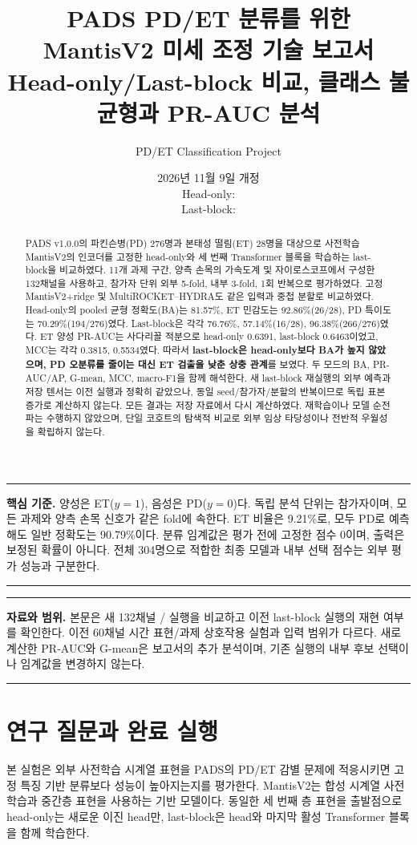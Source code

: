 \documentclass[11pt,a4paper]{article}
\title{\color{navy}\bfseries PADS PD/ET 분류를 위한\\[.3em]
 MantisV2 미세 조정 기술 보고서\\[.6em]
 \large Head-only/Last-block 비교, 클래스 불균형과 PR-AUC 분석}
\author{PD/ET Classification Project}
\date{2026년 11월 9일 개정\\[.25em]\small Head-only: \code{20261109T032315873662Z}\\
 Last-block: \code{20261109T041659480074Z}}
\newcommand{\code}[1]{\texttt{\detokenize{#1}}}
\newenvironment{keybox}{\begin{center}\begin{minipage}{.94\linewidth}\color{navy}\hrule\vspace{.6em}\small}
 {\vspace{.5em}\hrule\end{minipage}\end{center}}
\begin{document}
\maketitle\thispagestyle{empty}
\begin{abstract}
PADS v1.0.0의 파킨슨병(PD) 276명과 본태성 떨림(ET) 28명을 대상으로
사전학습 MantisV2의 인코더를 고정한 head-only와 세 번째 Transformer 블록을
학습하는 last-block을 비교하였다.
11개 과제 구간, 양측 손목의 가속도계 및 자이로스코프에서 구성한 132채널을 사용하고,
참가자 단위 외부 5-fold, 내부 3-fold, 1회 반복으로 평가하였다.
고정 MantisV2+ridge 및 MultiROCKET--HYDRA도 같은 입력과 중첩 분할로 비교하였다.
Head-only의 pooled 균형 정확도(BA)는 81.57\%, ET 민감도는 92.86\%(26/28),
PD 특이도는 70.29\%(194/276)였다. Last-block은 각각
76.76\%, 57.14\%(16/28), 96.38\%(266/276)였다.
ET 양성 PR-AUC는 사다리꼴 적분으로 head-only 0.6391, last-block 0.6463이었고,
MCC는 각각 0.3815, 0.5534였다.
따라서 \textbf{last-block은 head-only보다 BA가 높지 않았으며,
PD 오분류를 줄이는 대신 ET 검출을 낮춘 상충 관계}를 보였다.
두 모드의 BA, PR-AUC/AP, G-mean, MCC, macro-F1을 함께 해석한다.
새 last-block 재실행의 외부 예측과 저장 텐서는 이전 실행과 정확히 같았으나,
동일 seed/참가자/분할의 반복이므로 독립 표본 증가로 계산하지 않는다.
모든 결과는 저장 자료에서 다시 계산하였다. 재학습이나 모델 순전파는 수행하지 않았으며,
단일 코호트의 탐색적 비교로 외부 임상 타당성이나 전반적 우월성을 확립하지 않는다.
\end{abstract}
\begin{keybox}
\textbf{핵심 기준.} 양성은 ET($y=1$), 음성은 PD($y=0$)다.
독립 분석 단위는 참가자이며, 모든 과제와 양측 손목 신호가 같은 fold에 속한다.
ET 비율은 9.21\%로, 모두 PD로 예측해도 일반 정확도는 90.79\%이다.
분류 임계값은 평가 전에 고정한 점수 0이며, 출력은 보정된 확률이 아니다.
전체 304명으로 적합한 최종 모델과 내부 선택 점수는 외부 평가 성능과 구분한다.
\end{keybox}
\clearpage
\tableofcontents
\vfill
\begin{keybox}
\textbf{자료와 범위.} 본문은 새 132채널 \code{head-only}/\code{last-block} 실행을 비교하고
이전 last-block 실행의 재현 여부를 확인한다.
이전 60채널 시간 표현/과제 상호작용 실험과 입력 범위가 다르다.
새로 계산한 PR-AUC와 G-mean은 보고서의 추가 분석이며,
기존 실행의 내부 후보 선택이나 임계값을 변경하지 않는다.
\end{keybox}
\clearpage

\section{연구 질문과 완료 실행}
본 실험은 외부 사전학습 시계열 표현을 PADS의 PD/ET 감별 문제에 적응시키면
고정 특징 기반 분류보다 성능이 높아지는지를 평가한다.
MantisV2는 합성 시계열 사전학습과 중간층 표현을 사용하는 기반 모델이다\cite{mantis}.
동일한 세 번째 층 표현을 출발점으로 head-only는 새로운 이진 head만,
last-block은 head와 마지막 활성 Transformer 블록을 함께 학습한다.
\end{document}
